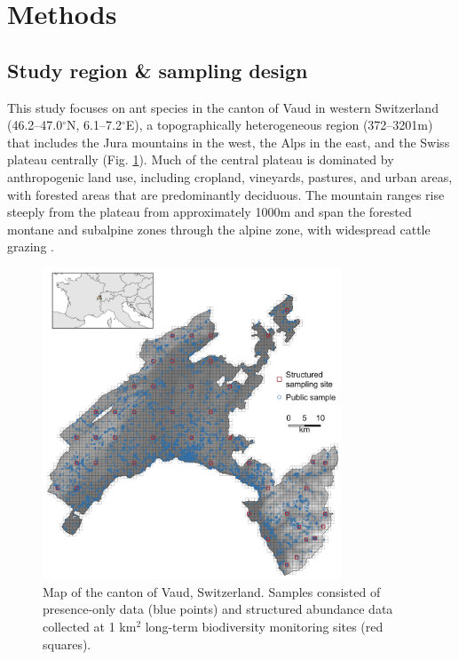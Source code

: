 \documentclass[preprint,review,times,12pt]{elsarticle}
\begin{document}
\section{Methods}
\label{S:2}
\subsection{Study region \& sampling design}
This study focuses on ant species in the canton of Vaud in western Switzerland (46.2–47.0$^{\circ}$N, 6.1–7.2$^{\circ}$E), a topographically heterogeneous region (372–3201m) that includes the Jura mountains in the west, the Alps in the east, and the Swiss plateau centrally (Fig. \ref{fig:VD_map}). Much of the central plateau is dominated by anthropogenic land use, including cropland, vineyards, pastures, and urban areas, with forested areas that are predominantly deciduous. The mountain ranges rise steeply from the plateau from approximately 1000m and span the forested montane and subalpine zones through the alpine zone, with widespread cattle grazing \citep{Delarze2015,Gago-Silva2017,Beck2017}. 

\begin{figure}
	\centering\includegraphics[width=3.5in]{ms/1_Ecography/1/figs/map_VD+inset.png}
	\caption{\label{fig:VD_map} Map of the canton of Vaud, Switzerland. Samples consisted of presence-only data (blue points) and structured abundance data collected at 1 km$^2$ long-term biodiversity monitoring sites (red squares). }
\end{figure}
\end{document}
